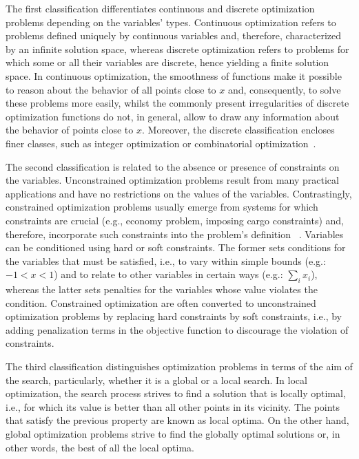 	The first classification differentiates continuous and discrete optimization problems depending on the variables' types. Continuous optimization refers to problems defined uniquely by continuous variables and, therefore, characterized by an infinite solution space, whereas discrete optimization refers to problems for which some or all their variables are discrete, hence yielding a finite solution space. In continuous optimization, the smoothness of functions make it possible to reason about the behavior of all points close to $x$ and, consequently, to solve these problems more easily, whilst the commonly present irregularities of discrete optimization functions do not, in general, allow to draw any information about the behavior of points close to $x$. Moreover, the discrete classification encloses finer classes, such as integer optimization or combinatorial optimization~\cite{Nemhauser1988}. 
	
	The second classification is related to the absence or presence of constraints on the variables. Unconstrained optimization problems result from many practical applications and have no restrictions on the values of the variables. Contrastingly, constrained optimization problems usually emerge from systems for which constraints are crucial (e.g., economy problem, imposing cargo constraints) and, therefore, incorporate such constraints into the problem's definition ~\cite{Nocedal2011NumericalOptimization}. Variables can be conditioned using hard or soft constraints. The former sets conditions for the variables that must be satisfied, i.e., to vary within simple bounds (e.g.: $-1<x<1$) and to relate to other variables in certain ways (e.g.: $\sum_{i} x_i$), whereas the latter sets penalties for the variables whose value violates the condition. Constrained optimization are often converted to unconstrained optimization problems by replacing hard constraints by soft constraints, i.e., by adding penalization terms in the objective function to discourage the violation of constraints. 
	
	The third classification distinguishes optimization problems in terms of the aim of the search, particularly, whether it is a global or a local search. In local optimization, the search process strives to find a solution that is locally optimal, i.e., for which its value is better than all other points in its vicinity. The points that satisfy the previous property are known as local optima. On the other hand, global optimization problems strive to find the globally optimal solutions or, in other words, the best of all the local optima.

